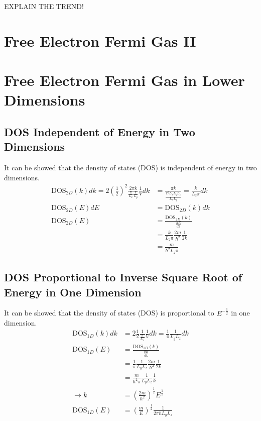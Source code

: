 \documentclass[11pt]{amsart}
\begin{document}
EXPLAIN THE TREND!

\section{Free Electron Fermi Gas II}

\section{Free Electron Fermi Gas in Lower Dimensions}

\subsection{DOS Independent of Energy in Two Dimensions}
It can be showed that the density of states (DOS) is independent of energy in two dimensions.
\begin{align*}
\text{DOS}_{2D}(k) dk = 2\left(\frac{1}{2} \right)^2\frac{2\pi k}{\frac{\pi}{L_x}\frac{\pi}{L_y}}\frac{1}{V} dk &= \frac{\pi k}{\frac{\pi^2L_xL_yL_z}{L_xL_y}}=\frac{k}{L_z\pi} dk \\
\text{DOS}_{2D}(E) dE &= \text{DOS}_{2D}(k) dk \\
\text{DOS}_{2D}(E) &= \frac{\text{DOS}_{2D}(k)}{\frac{dE}{dk}} \\
				&= \frac{k}{L_z\pi}\frac{2m}{\hbar^2}\frac{1}{2k} \\
				&= \frac{m}{\hbar^2L_z\pi}
\end{align*}

\subsection{DOS Proportional to Inverse Square Root of Energy in One Dimension}
It can be showed that the density of states (DOS) is proportional to $E^{-\frac{1}{2}}$ in one dimension.
\begin{align*}
\text{DOS}_{1D}(k)dk &= 2\frac{1}{2}\frac{1}{\frac{\pi}{L_x}}\frac{1}{V}dk = \frac{1}{\pi}\frac{1}{L_yL_z}dk \\
\text{DOS}_{1D}(E) &= \frac{\text{DOS}_{1D}(k)}{\frac{dE}{dk}} \\
 &=  \frac{1}{\pi}\frac{1}{L_yL_z}\frac{2m}{\hbar^2}\frac{1}{2k} \\
 &= \frac{m}{\hbar^2\pi}\frac{1}{L_yL_z}\frac{1}{k} \\ 
\rightarrow k &= \left(\frac{2m}{\hbar^2}\right)^{\frac{1}{2}} E^{\frac{1}{2}} \\
\text{DOS}_{1D}(E) &= \left(\frac{m}{E} \right)^{\frac{1}{2}} \frac{1}{2\pi\hbar L_y L_z}
\end{align*}
\end{document}
